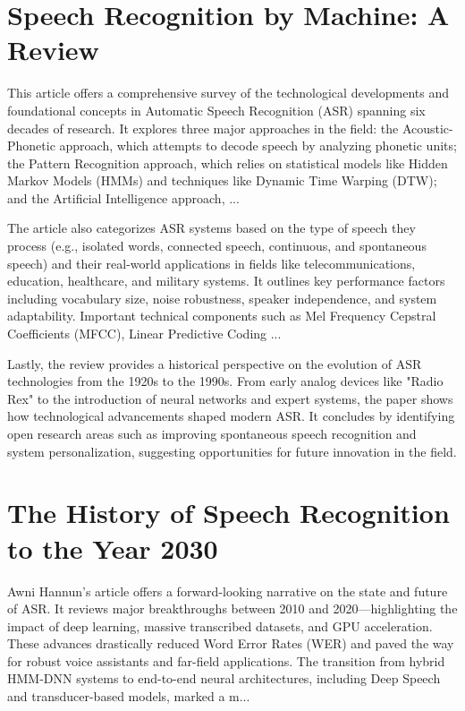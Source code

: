 \documentclass[12pt]{article}
\date{}
\begin{document}
\section*{Speech Recognition by Machine: A Review}
This article offers a comprehensive survey of the technological developments and foundational concepts in Automatic Speech Recognition (ASR) spanning six decades of research. It explores three major approaches in the field: the Acoustic-Phonetic approach, which attempts to decode speech by analyzing phonetic units; the Pattern Recognition approach, which relies on statistical models like Hidden Markov Models (HMMs) and techniques like Dynamic Time Warping (DTW); and the Artificial Intelligence approach, ...

The article also categorizes ASR systems based on the type of speech they process (e.g., isolated words, connected speech, continuous, and spontaneous speech) and their real-world applications in fields like telecommunications, education, healthcare, and military systems. It outlines key performance factors including vocabulary size, noise robustness, speaker independence, and system adaptability. Important technical components such as Mel Frequency Cepstral Coefficients (MFCC), Linear Predictive Coding ...

Lastly, the review provides a historical perspective on the evolution of ASR technologies from the 1920s to the 1990s. From early analog devices like "Radio Rex" to the introduction of neural networks and expert systems, the paper shows how technological advancements shaped modern ASR. It concludes by identifying open research areas such as improving spontaneous speech recognition and system personalization, suggesting opportunities for future innovation in the field.

\section*{The History of Speech Recognition to the Year 2030}
Awni Hannun's article offers a forward-looking narrative on the state and future of ASR. It reviews major breakthroughs between 2010 and 2020—highlighting the impact of deep learning, massive transcribed datasets, and GPU acceleration. These advances drastically reduced Word Error Rates (WER) and paved the way for robust voice assistants and far-field applications. The transition from hybrid HMM-DNN systems to end-to-end neural architectures, including Deep Speech and transducer-based models, marked a m...
\end{document}
